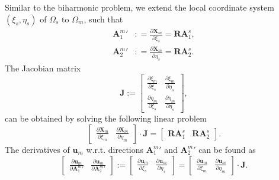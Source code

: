 \documentclass[preprint,12pt]{elsarticle}
\theoremstyle{remark}
\begin{document}
Similar to the biharmonic problem, we extend the local coordinate system $(\xi_s, \eta_s)$ of $\Omega_s$ to $\Omega_m$, such that
\begin{align}
    {\mathbf{A}_1^m}'&\colon=\frac{\partial\mathbf{X}_m}{\partial\xi_s}=\mathbf{R}\mathbf{A}_1^s,\\
    {\mathbf{A}_2^m}'&\colon=\frac{\partial\mathbf{X}_m}{\partial\eta_s}=\mathbf{R}\mathbf{A}_2^s.
\end{align}
The Jacobian matrix
\begin{equation}
    \mathbf{J}:=
    \begin{bmatrix}
        \frac{\partial\xi_m}{\partial\xi_s} & \frac{\partial\xi_m}{\partial\eta_s}\\
        \frac{\partial\eta_m}{\partial\xi_s} & \frac{\partial\eta_m}{\partial\eta_s}
    \end{bmatrix},
\end{equation}
can be obtained by solving the following linear problem 
\begin{equation}
    \begin{bmatrix}
        \frac{\partial\mathbf{X}_m}{\partial\xi_m} & \frac{\partial\mathbf{X}_m}{\partial\eta_m}
    \end{bmatrix}
    \cdot\mathbf{J}=
    \begin{bmatrix}
        \mathbf{R}\mathbf{A}_1^s & \mathbf{R}\mathbf{A}_2^s
    \end{bmatrix}.
\end{equation}
The derivatives of $\mathbf{u}_m$ w.r.t. directions ${\mathbf{A}_1^m}'$ and ${\mathbf{A}_2^m}'$ can be found as
\begin{equation}
    \begin{bmatrix}
        \frac{\partial\mathbf{u}_m}{\partial{\mathbf{A}_1^m}'} & \frac{\partial\mathbf{u}_m}{\partial{\mathbf{A}_2^m}'}
    \end{bmatrix}
    :=
    \begin{bmatrix}
        \frac{\partial\mathbf{u}_m}{\partial\xi_s} & \frac{\partial\mathbf{u}_m}{\partial\eta_s}
    \end{bmatrix}    
    =
    \begin{bmatrix}
        \frac{\partial\mathbf{u}_m}{\partial\xi_m} & \frac{\partial\mathbf{u}_m}{\partial\eta_m}
    \end{bmatrix}   
    \cdot\mathbf{J}.
\end{equation}
\end{document}
